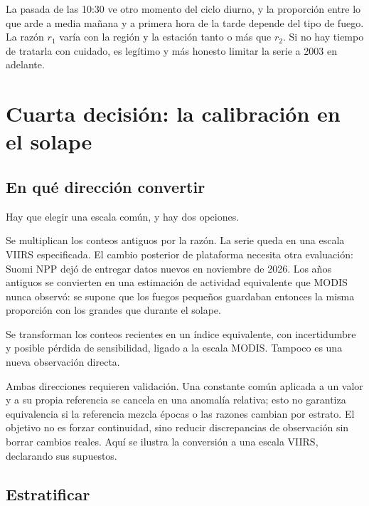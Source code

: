 \begin{atencion}
La pasada de las 10:30 ve otro momento del ciclo diurno, y la proporción entre lo que arde a
media mañana y a primera hora de la tarde depende del tipo de fuego. La razón $r_1$ varía con la
región y la estación tanto o más que $r_2$. Si no hay tiempo de tratarla con cuidado, es
legítimo y más honesto limitar la serie a 2003 en adelante.
\end{atencion}

\section{Cuarta decisión: la calibración en el solape}

\subsection{En qué dirección convertir}

Hay que elegir una escala común, y hay dos opciones.

\begin{description}[leftmargin=1.2em,style=nextline]
  \item[Llevar MODIS a la escala de VIIRS.] Se multiplican los conteos antiguos por la razón.
  La serie queda en una escala VIIRS especificada. El cambio posterior de plataforma
  necesita otra evaluación: Suomi NPP dejó de entregar datos nuevos en noviembre de 2026.
  Los años antiguos se convierten en una estimación de actividad equivalente que
  MODIS nunca observó: se supone que los fuegos pequeños guardaban entonces la misma proporción
  con los grandes que durante el solape.
  \item[Llevar VIIRS a la escala de MODIS.] Se transforman los conteos recientes en un
  índice equivalente, con incertidumbre y posible pérdida de sensibilidad, ligado a la
  escala MODIS. Tampoco es una nueva observación directa.
\end{description}

Ambas direcciones requieren validación. Una constante común aplicada a un valor y a su
propia referencia se cancela en una anomalía relativa; esto no garantiza equivalencia
si la referencia mezcla épocas o las razones cambian por estrato. El objetivo no es
forzar continuidad, sino reducir discrepancias de observación sin borrar cambios reales.
Aquí se ilustra la conversión a una escala VIIRS, declarando sus supuestos.

\subsection{Estratificar}

